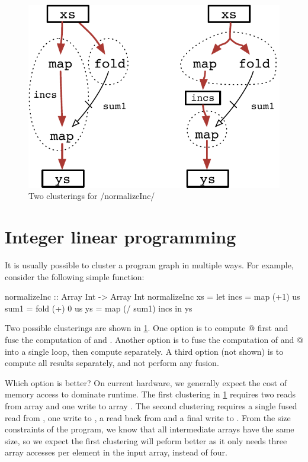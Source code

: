 
\begin{figure}
\begin{center}
\includegraphics[scale=0.7]{copy/03-body/clustering/figures/ex2-normalizeInc.pdf}
\end{center}
\caption{Two clusterings for \Hs/normalizeInc/}
\label{clustering:f:normalizeInc}
\end{figure}


\section{Integer linear programming}
\label{clustering:s:ILP}
It is usually possible to cluster a program graph in multiple ways.
For example, consider the following simple function:
\begin{haskell}
normalizeInc :: Array Int -> Array Int
normalizeInc xs
 = let incs = map  (+1)     us
       sum1 = fold (+) 0    us
       ys   = map  (/ sum1) incs
   in  ys
\end{haskell}

Two possible clusterings are shown in \cref{clustering:f:normalizeInc}.
One option is to compute @ first and fuse the computation of \Hs@incs@ and \Hs@ys@.
Another option is to fuse the computation of \Hs@incs@ and @ into a single loop, then compute \Hs@ys@ separately.
A third option (not shown) is to compute all results separately, and not perform any fusion. 

Which option is better?
On current hardware, we generally expect the cost of memory access to dominate runtime.
The first clustering in \cref{clustering:f:normalizeInc} requires two reads from array \Hs@xs@ and one write to array \Hs@ys@.
The second clustering requires a single fused read from \Hs@xs@, one write to \Hs@incs@, a read back from \Hs@incs@ and a final write to \Hs@ys@.
From the size constraints of the program, we know that all intermediate arrays have the same size, so we expect the first clustering will peform better as it only needs three array accesses per element in the input array, instead of four. 

